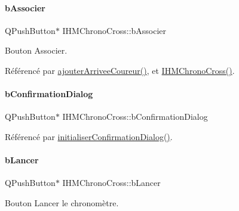\paragraph{\texorpdfstring{b\+Associer}{bAssocier}}
{\footnotesize\ttfamily Q\+Push\+Button$\ast$ I\+H\+M\+Chrono\+Cross\+::b\+Associer\hspace{0.3cm}{\ttfamily [private]}}



Bouton Associer. 



Référencé par \hyperlink{class_i_h_m_chrono_cross_a2ce63851d1f2723057ac649b7e320cfe}{ajouter\+Arrivee\+Coureur()}, et \hyperlink{class_i_h_m_chrono_cross_a479fc90733fba3e65fb06aa4a3adc02e}{I\+H\+M\+Chrono\+Cross()}.

\mbox{\label{class_i_h_m_chrono_cross_a57bb61d8175dc09f0497ee3834cb6ad5}} 
\paragraph{\texorpdfstring{b\+Confirmation\+Dialog}{bConfirmationDialog}}
{\footnotesize\ttfamily Q\+Push\+Button$\ast$ I\+H\+M\+Chrono\+Cross\+::b\+Confirmation\+Dialog\hspace{0.3cm}{\ttfamily [private]}}



Référencé par \hyperlink{class_i_h_m_chrono_cross_a866a247fad23eca2af31ed985afe7cd3}{initialiser\+Confirmation\+Dialog()}.

\mbox{\label{class_i_h_m_chrono_cross_a1b0a7c5e58d6a9f873cdc912d67b8de9}} 
\paragraph{\texorpdfstring{b\+Lancer}{bLancer}}
{\footnotesize\ttfamily Q\+Push\+Button$\ast$ I\+H\+M\+Chrono\+Cross\+::b\+Lancer\hspace{0.3cm}{\ttfamily [private]}}



Bouton Lancer le chronomètre. 



